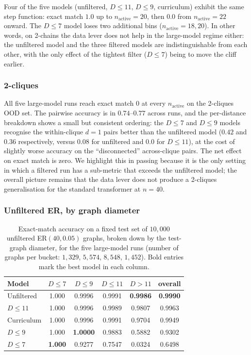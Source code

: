 \documentclass[11pt,a4paper]{article}
\begin{document}
Four of the five models (unfiltered, $D \le 11$, $D \le 9$, curriculum)
exhibit the same step function: exact match $1.0$ up to
$n_{\text{active}} = 20$, then $0.0$ from $n_{\text{active}} = 22$
onward. The $D \le 7$ model loses two additional bins
($n_{\text{active}} = 18, 20$). In other words, on 2-chains the data
lever does not help in the large-model regime either: the unfiltered
model and the three filtered models are indistinguishable from each
other, with the only effect of the tightest filter ($D \le 7$) being to
move the cliff earlier.

\subsubsection*{2-cliques}

All five large-model runs reach exact match $0$ at every
$n_{\text{active}}$ on the 2-cliques OOD set. The pairwise accuracy is in
$0.74$--$0.77$ across runs, and the per-distance breakdown shows a small
but consistent ordering: the $D \le 7$ and $D \le 9$ models recognise
the within-clique $d = 1$ pairs better than the unfiltered model
($0.42$ and $0.36$ respectively, versus $0.08$ for unfiltered and
$0.0$ for $D \le 11$), at the cost of slightly worse accuracy on the
``disconnected'' across-clique pairs. The net effect on exact match is
zero. We highlight this in passing because it is the only setting in
which a filtered run has a sub-metric that exceeds the unfiltered model;
the overall picture remains that the data lever does not produce a
2-cliques generalisation for the standard transformer at $n = 40$.

\subsubsection*{Unfiltered ER, by graph diameter}

\begin{table}[H]
\centering
\begin{tabular}{lccccc}
\toprule
Model       & $D \le 7$ & $D \le 9$ & $D \le 11$ & $D > 11$ & overall \\
\midrule
Unfiltered  & 1.000 & 0.9996 & 0.9991 & \textbf{0.9986} & \textbf{0.9990} \\
$D \le 11$  & 1.000 & 0.9996 & 0.9989 & 0.9807 & 0.9963 \\
Curriculum  & 1.000 & 0.9996 & 0.9991 & 0.9704 & 0.9949 \\
$D \le 9$   & 1.000 & \textbf{1.0000} & 0.9883 & 0.5882 & 0.9302 \\
$D \le 7$   & \textbf{1.000} & 0.9277 & 0.7547 & 0.0324 & 0.6498 \\
\bottomrule
\end{tabular}
\caption{Exact-match accuracy on a fixed test set of $10{,}000$
unfiltered ER$(40, 0.05)$ graphs, broken down by the test-graph
diameter, for the five large-model runs (number of graphs per bucket:
$1{,}329$, $5{,}574$, $8{,}548$, $1{,}452$). Bold entries mark the best
model in each column.}
\label{tab:ood-er-buckets-big}
\end{table}
\end{document}
